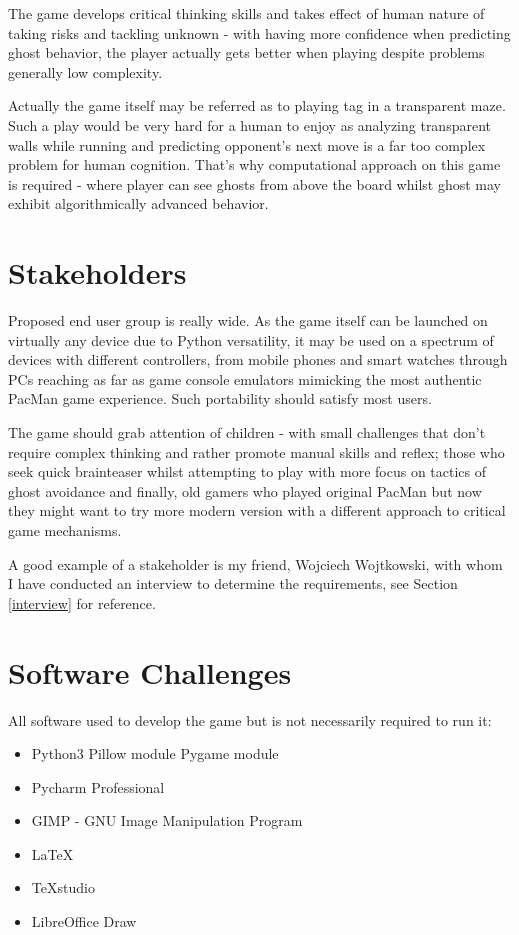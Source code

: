 \documentclass[11pt,a4paper]{report}
\begin{document}
			
			The game develops critical thinking skills and takes effect of human nature of taking risks and tackling unknown - with having more confidence when predicting ghost behavior, the player actually gets better when playing despite problems generally low complexity.
			
			Actually the game itself may be referred as to playing tag in a transparent maze. Such a play would be very hard for a human to enjoy as analyzing transparent walls while running and predicting opponent's next move is a far too complex problem for human cognition. That's why computational approach on this game is required - where player can see ghosts from above the board whilst ghost may exhibit algorithmically advanced behavior.
		\section{Stakeholders}
			Proposed end user group is really wide. As the game itself can be launched on virtually any device due to Python versatility, it may be used on a spectrum of devices with different controllers, from mobile phones and smart watches through PCs reaching as far as game console emulators mimicking the most authentic PacMan game experience. Such portability should satisfy most users.
			
			The game should grab attention of children - with small challenges that don't require complex thinking and rather promote manual skills and reflex; those who seek quick brainteaser whilst attempting to play with more focus on tactics of ghost avoidance and finally, old gamers who played original PacMan but now they might want to try more modern version with a different approach to critical game mechanisms.
			
			A good example of a stakeholder is my friend, Wojciech Wojtkowski, with whom I have conducted an interview to determine the requirements, see Section \ref{interview} for reference.
		\section{Software Challenges}
			All software used to develop the game but is not necessarily required to run it:
			\begin{itemize}
				\item Python3
				\subitem Pillow module
				\subitem Pygame module
				\item Pycharm Professional
				\item GIMP - GNU Image Manipulation Program
				\item \LaTeX
				\item TeXstudio
				\item LibreOffice Draw
			\end{itemize}
			
\end{document}
